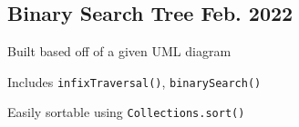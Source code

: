 \documentclass[letter,10pt]{article}
\begin{document}
\subsection{{Binary Search Tree \hfill Feb. 2022}}
\begin{zitemize}
	\item Built based off of a given UML diagram
	\item Includes \verb|infixTraversal()|, \verb|binarySearch()|
	\item Easily sortable using \verb|Collections.sort()|
\end{zitemize}


\end{document}
